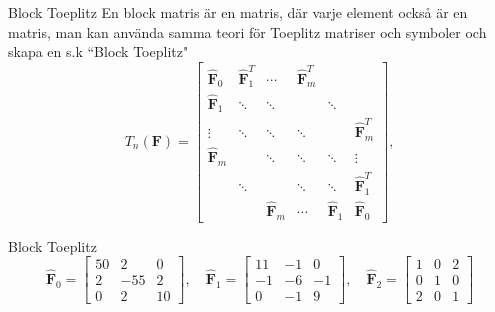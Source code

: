 \documentclass{beamer}
\begin{document}
\begin{frame}{Block Toeplitz}
En block matris är en matris, där varje element också är en matris, man kan använda samma teori för Toeplitz matriser och symboler och skapa en s.k ``Block Toeplitz" 
\begin{equation}
    T_n(\mathbf{F}) = \begin{bmatrix}
        \hat{\mathbf{F}}_0 & \hat{\mathbf{F}}_1^T &\cdots & \hat{\mathbf{F}}_m^T \\ 
        \hat{\mathbf{F}}_1& \ddots&\ddots & & \ddots \\
        \vdots & \ddots &\ddots & \ddots & & \hat{\mathbf{F}}_m^T \\
        \hat{\mathbf{F}}_m & & \ddots& \ddots&\ddots & \vdots \\
        & \ddots &  & \ddots&\ddots&\hat{\mathbf{F}}_1^T \\
        & & \hat{\mathbf{F}}_m& \cdots & \hat{\mathbf{F}}_1&\hat{\mathbf{F}}_0
    \end{bmatrix},
    \label{eq: block-matrix template}
\end{equation}
\end{frame}

\begin{frame}{Block Toeplitz}
    \begin{equation}
    \hat{\mathbf{F}}_0=\begin{bmatrix}
    50 & 2 & 0 \\ 2 &-55 & 2 \\ 0 & 2 & 10
    \end{bmatrix}, \quad
    \hat{\mathbf{F}}_1 = \begin{bmatrix}
        11 & -1 & 0 \\ -1 & -6 & -1 \\ 0 & -1 &9
    \end{bmatrix}, \quad
    \hat{\mathbf{F}}_2 = \begin{bmatrix}
    1 & 0 & 2 \\ 0 & 1 & 0 \\2 & 0 & 1
    \end{bmatrix}
    \label{block-matrix entries}
\end{equation}
\end{frame}
\end{document}
